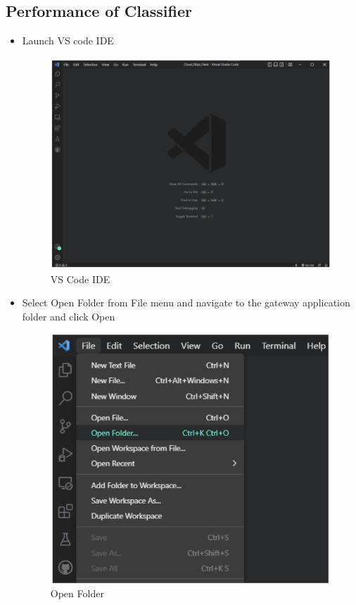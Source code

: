 \documentclass[10pt]{article}
\begin{document}
\subsection{Performance of Classifier}
\begin{itemize}
    \item Launch VS code IDE 
    \begin{figure}[H]
    \begin{center}
        \includegraphics[width=0.7\linewidth, frame]{CA2-template/CM38.png}
       \caption{VS Code IDE \label{fig:28}}
    \end{center}
\end{figure}

\item Select Open Folder from File menu and navigate to the gateway application folder and click Open
\begin{figure}[H]
    \begin{center}
        \includegraphics[width=0.7\linewidth, frame]{CA2-template/CM39.png}
       \caption{Open Folder \label{fig:29}}
    \end{center}
\end{figure}


\end{itemize}
\end{document}
